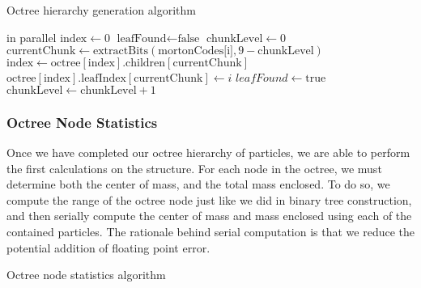 \documentclass{thesis}
\begin{document}
\begin{algorithm}
    \label{alg:LinkOctree}
    \caption{Octree hierarchy generation algorithm}
    \begin{algorithmic}
         in parallel
            \State $\text{index} \gets 0$
            \State $\text{leafFound} \gets \text{false}$
            \State $\text{chunkLevel} \gets 0$
                \State $\text{currentChunk} \gets \text{extractBits}(\text{mortonCodes[i]}, 9 - \text{chunkLevel})$
                    \State $\text{index} \gets \text{octree}[\text{index}].\text{children}[\text{currentChunk}]$
                \Else
                    \State $\text{octree}[\text{index}].\text{leafIndex}[\text{currentChunk}] \gets i$
                    \State $leafFound \gets \text{true}$
                \EndIf
                \State $\text{chunkLevel} \gets \text{chunkLevel} + 1$
            \EndWhile
        \EndFor
    \end{algorithmic}
\end{algorithm}
\subsubsection{Octree Node Statistics}
Once we have completed our octree hierarchy of particles, we are able to perform the first calculations on the structure. For each node in the octree, we must determine both the center of mass, and the total mass enclosed. To do so, we compute the range of the octree node just like we did in binary tree construction, and then serially compute the center of mass and mass enclosed using each of the contained particles. The rationale behind serial computation is that we reduce the potential addition of floating point error.
\begin{algorithm}
    \label{alg:OctreeNodeStats}
    \caption{Octree node statistics algorithm}
    \begin{algorithmic}
        \EndFor
    \end{algorithmic}
\end{algorithm}
\end{document}
